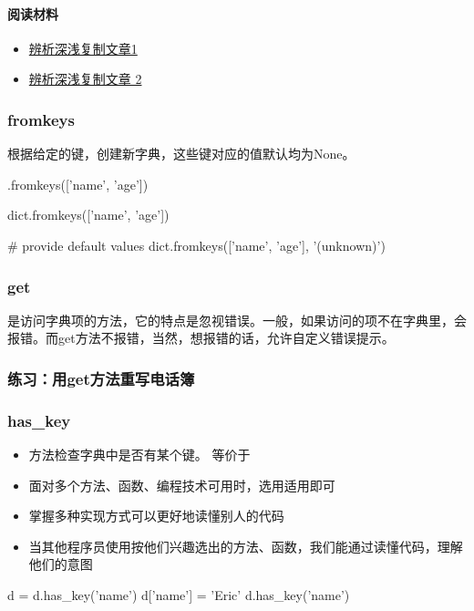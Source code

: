 \paragraph{阅读材料}
\begin{itemize}
\item \href{https://docs.python.org/2/library/copy.html}{辨析深浅复制文章1}
\item \href{https://www.quora.com/What-is-deep-copy-and-shallow-copy-in-Python}{辨析深浅复制文章 2}
\end{itemize}
\subsubsection{fromkeys}
根据给定的键，创建新字典，这些键对应的值默认均为None。
\begin{python}
{}.fromkeys(['name', 'age'])

dict.fromkeys(['name', 'age'])

# provide default values
dict.fromkeys(['name', 'age'], '(unknown)')
\end{python}
\subsubsection{get}
是访问字典项的方法，它的特点是忽视错误。一般，如果访问的项不在字典里，会报错。而get方法不报错，当然，想报错的话，允许自定义错误提示。
\subsubsection{练习：用get方法重写电话簿}
\subsubsection{has\_key}
\begin{itemize}
\item {}方法检查字典中是否有某个键。 等价于
\item 面对多个方法、函数、编程技术可用时，选用适用即可
\item 掌握多种实现方式可以更好地读懂别人的代码
\item 当其他程序员使用按他们兴趣选出的方法、函数，我们能通过读懂代码，理解他们的意图
\end{itemize}
\begin{python}
d = {}
d.has_key('name')
d['name'] = 'Eric'
d.has_key('name')
\end{python}
